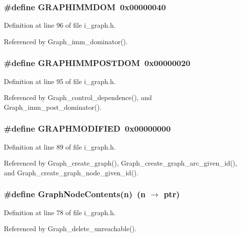 \subsubsection{\setlength{\rightskip}{0pt plus 5cm}\#define GRAPHIMMDOM~0x00000040}\label{i__graph_8h_2ed8c169b4e4035268822374d63426de}




Definition at line 96 of file i\_\-graph.h.

Referenced by Graph\_\-imm\_\-dominator().
\subsubsection{\setlength{\rightskip}{0pt plus 5cm}\#define GRAPHIMMPOSTDOM~0x00000020}\label{i__graph_8h_c238412b5313ff357d52ba5c3f0bb0a0}




Definition at line 95 of file i\_\-graph.h.

Referenced by Graph\_\-control\_\-dependence(), and Graph\_\-imm\_\-post\_\-dominator().
\subsubsection{\setlength{\rightskip}{0pt plus 5cm}\#define GRAPHMODIFIED~0x00000000}\label{i__graph_8h_8c37d945015a688401c785ff51a9c7a1}




Definition at line 89 of file i\_\-graph.h.

Referenced by Graph\_\-create\_\-graph(), Graph\_\-create\_\-graph\_\-arc\_\-given\_\-id(), and Graph\_\-create\_\-graph\_\-node\_\-given\_\-id().
\subsubsection{\setlength{\rightskip}{0pt plus 5cm}\#define Graph\-Node\-Contents(n)~(n $\rightarrow$ ptr)}\label{i__graph_8h_2b3afa4cd5671d50a609b6bf1b92ee9b}




Definition at line 78 of file i\_\-graph.h.

Referenced by Graph\_\-delete\_\-unreachable().

